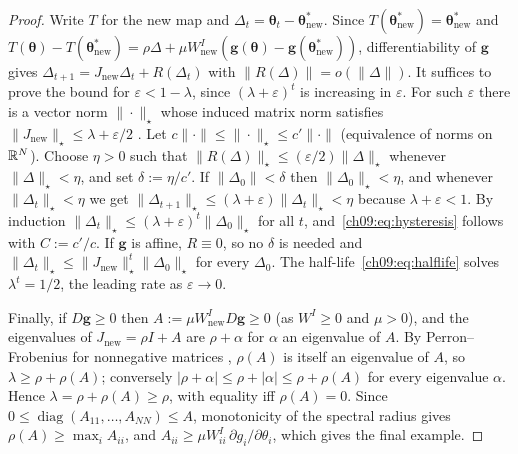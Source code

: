 \documentclass[../structural_economics_book.tex]{subfiles}
\begin{document}
\begin{proof}
Write $T$ for the new map and $\Delta_t = \boldsymbol{\theta}_t - \boldsymbol{\theta}^*_{\text{new}}$. Since $T(\boldsymbol{\theta}^*_{\text{new}}) = \boldsymbol{\theta}^*_{\text{new}}$ and $T(\boldsymbol{\theta}) - T(\boldsymbol{\theta}^*_{\text{new}}) = \rho\Delta + \mu W^I_{\text{new}}(\mathbf{g}(\boldsymbol{\theta}) - \mathbf{g}(\boldsymbol{\theta}^*_{\text{new}}))$, differentiability of $\mathbf{g}$ gives $\Delta_{t+1} = J_{\text{new}}\Delta_t + R(\Delta_t)$ with $\|R(\Delta)\| = o(\|\Delta\|)$. It suffices to prove the bound for $\varepsilon < 1 - \lambda$, since $(\lambda+\varepsilon)^t$ is increasing in $\varepsilon$. For such $\varepsilon$ there is a vector norm $\|\cdot\|_\star$ whose induced matrix norm satisfies $\|J_{\text{new}}\|_\star \le \lambda + \varepsilon/2$ \citep[Lemma~5.6.10]{horn2012matrix}. Let $c\|\cdot\| \le \|\cdot\|_\star \le c'\|\cdot\|$ (equivalence of norms on $\mathbb{R}^N$). Choose $\eta > 0$ such that $\|R(\Delta)\|_\star \le (\varepsilon/2)\|\Delta\|_\star$ whenever $\|\Delta\|_\star < \eta$, and set $\delta := \eta/c'$. If $\|\Delta_0\| < \delta$ then $\|\Delta_0\|_\star < \eta$, and whenever $\|\Delta_t\|_\star < \eta$ we get $\|\Delta_{t+1}\|_\star \le (\lambda+\varepsilon)\|\Delta_t\|_\star < \eta$ because $\lambda + \varepsilon < 1$. By induction $\|\Delta_t\|_\star \le (\lambda+\varepsilon)^t\|\Delta_0\|_\star$ for all $t$, and~\eqref{ch09:eq:hysteresis} follows with $C := c'/c$. If $\mathbf{g}$ is affine, $R \equiv 0$, so no $\delta$ is needed and $\|\Delta_t\|_\star \le \|J_{\text{new}}\|_\star^t\|\Delta_0\|_\star$ for every $\Delta_0$. The half-life~\eqref{ch09:eq:halflife} solves $\lambda^{t} = 1/2$, the leading rate as $\varepsilon \to 0$.

Finally, if $D\mathbf{g} \geq 0$ then $A := \mu W^I_{\text{new}}D\mathbf{g} \geq 0$ (as $W^I \ge 0$ and $\mu > 0$), and the eigenvalues of $J_{\text{new}} = \rho I + A$ are $\rho + \alpha$ for $\alpha$ an eigenvalue of $A$. By Perron--Frobenius for nonnegative matrices \citep[Thm.~8.3.1]{horn2012matrix}, $\rho(A)$ is itself an eigenvalue of $A$, so $\lambda \ge \rho + \rho(A)$; conversely $|\rho + \alpha| \le \rho + |\alpha| \le \rho + \rho(A)$ for every eigenvalue $\alpha$. Hence $\lambda = \rho + \rho(A) \geq \rho$, with equality iff $\rho(A) = 0$. Since $0 \le \operatorname{diag}(A_{11}, \ldots, A_{NN}) \le A$, monotonicity of the spectral radius \citep[Thm.~8.1.18]{horn2012matrix} gives $\rho(A) \ge \max_i A_{ii}$, and $A_{ii} \ge \mu W^I_{ii}\,\partial g_i/\partial\theta_i$, which gives the final example.
\end{proof}
\end{document}
